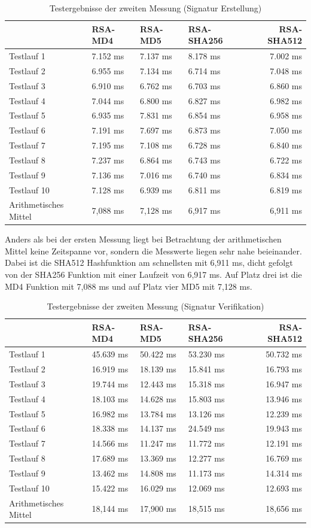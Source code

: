 \begin{table}[h]
	\begin{tabularx}{\textwidth}{p{}|X|X|X|r}
		& RSA-MD4 & RSA-MD5 & RSA-SHA256 & RSA-SHA512\\
		\hline
		Testlauf 1& 7.152 ms& 7.137 ms& 8.178 ms& 7.002 ms\\
		Testlauf 2& 6.955 ms& 7.134 ms& 6.714 ms& 7.048 ms\\
		Testlauf 3& 6.910 ms& 6.762 ms& 6.703 ms& 6.860 ms\\
		Testlauf 4& 7.044 ms& 6.800 ms& 6.827 ms& 6.982 ms\\
		Testlauf 5& 6.935 ms& 7.831 ms& 6.854 ms& 6.958 ms\\
		Testlauf 6& 7.191 ms& 7.697 ms& 6.873 ms& 7.050 ms\\
		Testlauf 7& 7.195 ms& 7.108 ms& 6.728 ms& 6.840 ms\\
		Testlauf 8& 7.237 ms& 6.864 ms& 6.743 ms& 6.722 ms\\
		Testlauf 9& 7.136 ms& 7.016 ms& 6.740 ms& 6.834 ms\\
		Testlauf 10& 7.128 ms& 6.939 ms& 6.811 ms& 6.819 ms\\
		\hline
		Arithmetisches Mittel& 7,088 ms& 7,128 ms& 6,917 ms& 6,911 ms
	\end{tabularx}
	\caption{Testergebnisse der zweiten Messung (Signatur Erstellung)}
\end{table}
Anders als bei der ersten Messung liegt bei Betrachtung der arithmetischen Mittel keine Zeitspanne vor, sondern die Messwerte liegen sehr nahe beieinander. Dabei ist die SHA512 Hashfunktion am schnellsten mit 6,911 ms, dicht gefolgt von der SHA256 Funktion mit einer Laufzeit von 6,917 ms. Auf Platz drei ist die MD4 Funktion mit 7,088 ms und auf Platz vier MD5 mit 7,128 ms.\\
\begin{table}[h]
	\begin{tabularx}{\textwidth}{p{}|X|X|X|r}
		& RSA-MD4 & RSA-MD5 & RSA-SHA256 & RSA-SHA512\\
		\hline
		Testlauf 1& 45.639 ms& 50.422 ms& 53.230 ms& 50.732 ms\\
		Testlauf 2& 16.919 ms& 18.139 ms& 15.841 ms& 16.793 ms\\
		Testlauf 3& 19.744 ms& 12.443 ms& 15.318 ms& 16.947 ms\\
		Testlauf 4& 18.103 ms& 14.628 ms& 15.803 ms& 13.946 ms\\
		Testlauf 5& 16.982 ms& 13.784 ms& 13.126 ms& 12.239 ms\\
		Testlauf 6& 18.338 ms& 14.137 ms& 24.549 ms& 19.943 ms\\
		Testlauf 7& 14.566 ms& 11.247 ms& 11.772 ms& 12.191 ms\\
		Testlauf 8& 17.689 ms& 13.369 ms& 12.277 ms& 16.769 ms\\
		Testlauf 9& 13.462 ms& 14.808 ms& 11.173 ms& 14.314 ms\\
		Testlauf 10& 15.422 ms& 16.029 ms& 12.069 ms& 12.693 ms\\
		\hline
		Arithmetisches Mittel& 18,144 ms& 17,900 ms& 18,515 ms& 18,656 ms
	\end{tabularx}
	\caption{Testergebnisse der zweiten Messung (Signatur Verifikation)}
\end{table}
